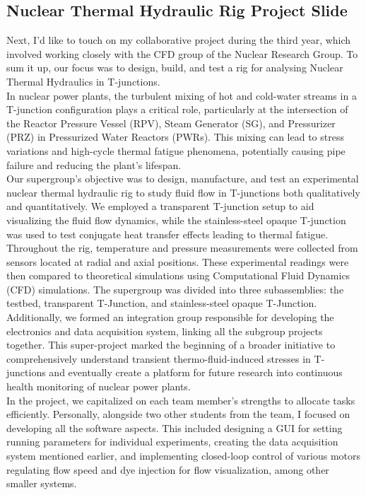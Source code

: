 \documentclass[8pt,a5paper]{article}
\begin{document}
\subsection*{Nuclear Thermal Hydraulic Rig Project Slide}

Next, I'd like to touch on my collaborative project during the third year, which involved working closely with the CFD group of the Nuclear Research Group. To sum it up, our focus was to design, build, and test a rig for analysing Nuclear Thermal Hydraulics in T-junctions.\\

In nuclear power plants, the turbulent mixing of hot and cold-water streams in a T-junction configuration plays a critical role, particularly at the intersection of the Reactor Pressure Vessel (RPV), Steam Generator (SG), and Pressurizer (PRZ) in Pressurized Water Reactors (PWRs). This mixing can lead to stress variations and high-cycle thermal fatigue phenomena, potentially causing pipe failure and reducing the plant's lifespan.\\

Our supergroup's objective was to design, manufacture, and test an experimental nuclear thermal hydraulic rig to study fluid flow in T-junctions both qualitatively and quantitatively. We employed a transparent T-junction setup to aid visualizing the fluid flow dynamics, while the stainless-steel opaque T-junction was used to test conjugate heat transfer effects leading to thermal fatigue. Throughout the rig, temperature and pressure measurements were collected from sensors located at radial and axial positions. These experimental readings were then compared to theoretical simulations using Computational Fluid Dynamics (CFD) simulations. The supergroup was divided into three subassemblies: the testbed, transparent T-Junction, and stainless-steel opaque T-Junction. Additionally, we formed an integration group responsible for developing the electronics and data acquisition system, linking all the subgroup projects together. This super-project marked the beginning of a broader initiative to comprehensively understand transient thermo-fluid-induced stresses in T-junctions and eventually create a platform for future research into continuous health monitoring of nuclear power plants.\\

In the project, we capitalized on each team member's strengths to allocate tasks efficiently. Personally, alongside two other students from the team, I focused on developing all the software aspects. This included designing a GUI for setting running parameters for individual experiments, creating the data acquisition system mentioned earlier, and implementing closed-loop control of various motors regulating flow speed and dye injection for flow visualization, among other smaller systems.\\
\end{document}

